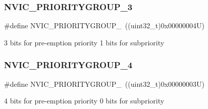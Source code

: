 \subsubsection{\texorpdfstring{NVIC\_PRIORITYGROUP\_3}{NVIC\_PRIORITYGROUP\_3}}
{\footnotesize\ttfamily \#define N\+V\+I\+C\+\_\+\+P\+R\+I\+O\+R\+I\+T\+Y\+G\+R\+O\+U\+P\+\_~((uint32\+\_\+t)0x00000004\+U)}

3 bits for pre-\/emption priority 1 bits for subpriority \mbox{\label{group___c_o_r_t_e_x___preemption___priority___group_gae6eab9140204bc938255aa148e597c45}} 
\subsubsection{\texorpdfstring{NVIC\_PRIORITYGROUP\_4}{NVIC\_PRIORITYGROUP\_4}}
{\footnotesize\ttfamily \#define N\+V\+I\+C\+\_\+\+P\+R\+I\+O\+R\+I\+T\+Y\+G\+R\+O\+U\+P\+\_~((uint32\+\_\+t)0x00000003\+U)}

4 bits for pre-\/emption priority 0 bits for subpriority 